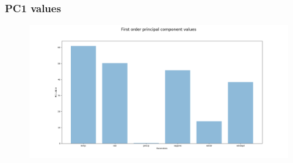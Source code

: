 \begin{frame}
\frametitle{PC1 values}
\begin{figure}
	\includegraphics[width=1\textwidth]{images/PC1_values.png}
\end{figure}
\end{frame}
